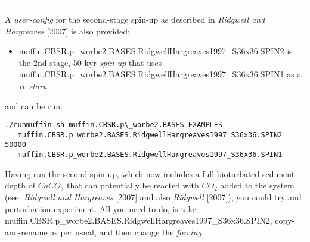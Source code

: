 \vspace{1mm}
\noindent\rule{4cm}{0.1mm}
\vspace{2mm}

\noindent A \textit{user-config} for the second-stage spin-up as described in \textit{Ridgwell and Hargreaves} [2007] is also provided:
\begin{itemize}[noitemsep]
\vspace{1mm}
\item \textsf{\footnotesize muffin.CBSR.p\_worbe2.BASES.RidgwellHargreaves1997\_S36x36.SPIN2} is the 2nd-stage, 50 kyr \textit{spin-up} that uses \textsf{\footnotesize muffin.CBSR.p\_worbe2.BASES.RidgwellHargreaves1997\_S36x36.SPIN1} as a \textit{re-start}.
\end{itemize}
\vspace{1mm}
and can be run:
\vspace{-1mm}\small\begin{verbatim}
./runmuffin.sh muffin.CBSR.p\_worbe2.BASES EXAMPLES
   muffin.CBSR.p_worbe2.BASES.RidgwellHargreaves1997_S36x36.SPIN2 50000
   muffin.CBSR.p_worbe2.BASES.RidgwellHargreaves1997_S36x36.SPIN1
\end{verbatim}\normalsize\vspace{-1mm}

Having run the second spin-up, which now includes a full bioturbated sediment depth of \(CaCO_{3}\) that can potentially be reacted with \(CO_{2}\) added to the system (see: \textit{Ridgwell and Hargreaves} [2007] and also \textit{Ridgwell} [2007]), you could try and perturbation experiment. All you need to do, is take \textsf{\footnotesize muffin.CBSR.p\_worbe2.BASES.RidgwellHargreaves1997\_S36x36.SPIN2}, copy-and-rename as per usual, and then change the \textit{forcing}.

\newpage

